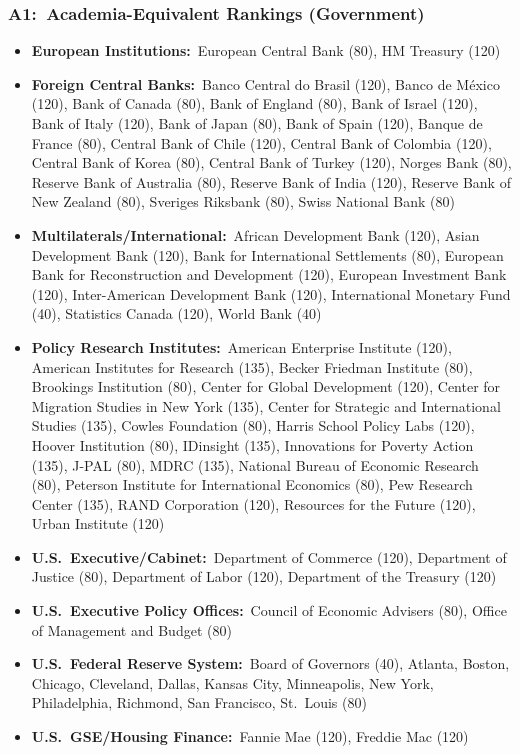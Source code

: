 \documentclass[12pt, aspectratio=169]{beamer}
\begin{document}
\begin{frame}[label=aerg]
\frametitle{A1:\ Academia-Equivalent Rankings (Government)}
\begin{itemize}
\tiny
\item \textbf{European Institutions:}\ European Central Bank (80), HM Treasury (120)
\item \textbf{Foreign Central Banks:}\ Banco Central do Brasil (120), Banco de M\'{e}xico (120), Bank of Canada (80), Bank of England (80), Bank of Israel (120), Bank of Italy (120), Bank of Japan (80), Bank of Spain (120), Banque de France (80), Central Bank of Chile (120), Central Bank of Colombia (120), Central Bank of Korea (80), Central Bank of Turkey (120), Norges Bank (80), Reserve Bank of Australia (80), Reserve Bank of India (120), Reserve Bank of New Zealand (80), Sveriges Riksbank (80), Swiss National Bank (80)
\item \textbf{Multilaterals/International:}\ African Development Bank (120), Asian Development Bank (120), Bank for International Settlements (80), European Bank for Reconstruction and Development (120), European Investment Bank (120), Inter-American Development Bank (120), International Monetary Fund (40), Statistics Canada (120), World Bank (40)
\item \textbf{Policy Research Institutes:}\ American Enterprise Institute (120), American Institutes for Research (135), Becker Friedman Institute (80), Brookings Institution (80), Center for Global Development (120), Center for Migration Studies in New York (135), Center for Strategic and International Studies (135), Cowles Foundation (80), Harris School Policy Labs (120), Hoover Institution (80), IDinsight (135), Innovations for Poverty Action (135), J-PAL (80), MDRC (135), National Bureau of Economic Research (80), Peterson Institute for International Economics (80), Pew Research Center (135), RAND Corporation (120), Resources for the Future (120), Urban Institute (120)
\item \textbf{U.S.\ Executive/Cabinet:}\ Department of Commerce (120), Department of Justice (80), Department of Labor (120), Department of the Treasury (120)
\item \textbf{U.S.\ Executive Policy Offices:}\ Council of Economic Advisers (80), Office of Management and Budget (80)
\item \textbf{U.S.\ Federal Reserve System:}\ Board of Governors (40), Atlanta, Boston, Chicago, Cleveland, Dallas, Kansas City, Minneapolis, New York, Philadelphia, Richmond, San Francisco, St.\ Louis (80)
\item \textbf{U.S.\ GSE/Housing Finance:}\ Fannie Mae (120), Freddie Mac (120)

\end{itemize}
\end{frame}
\end{document}
